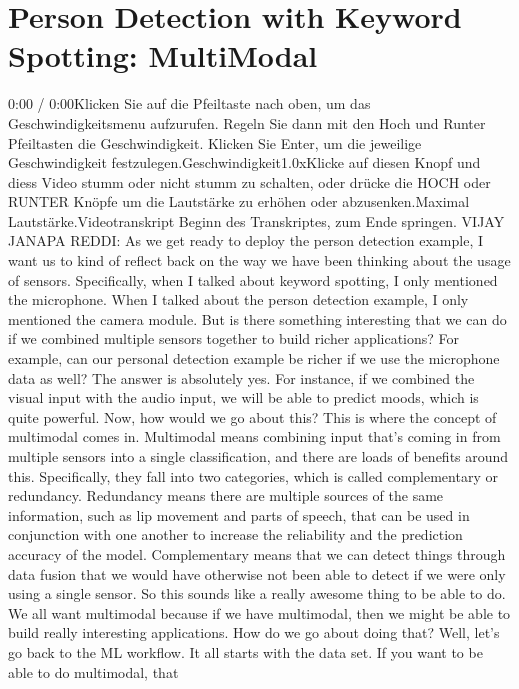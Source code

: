 \section{Person Detection with Keyword Spotting: MultiModal}

    0:00 / 0:00Klicken Sie auf die Pfeiltaste nach oben, um das Geschwindigkeitsmenu aufzurufen. Regeln Sie dann mit den Hoch und Runter Pfeiltasten die Geschwindigkeit. Klicken Sie Enter, um die jeweilige Geschwindigkeit festzulegen.Geschwindigkeit1.0xKlicke auf diesen Knopf und diess Video stumm oder nicht stumm zu schalten, oder drücke die HOCH oder RUNTER Knöpfe um die Lautstärke zu erhöhen oder abzusenken.Maximal Lautstärke.Videotranskript
    Beginn des Transkriptes, zum Ende springen.
    VIJAY JANAPA REDDI: As we get ready to deploy the person detection example,
    I want us to kind of reflect back on the way we have been
    thinking about the usage of sensors.
    Specifically, when I talked about keyword spotting,
    I only mentioned the microphone.
    When I talked about the person detection example,
    I only mentioned the camera module.
    But is there something interesting that we
    can do if we combined multiple sensors together to build richer applications?
    For example, can our personal detection example
    be richer if we use the microphone data as well?
    The answer is absolutely yes.
    For instance, if we combined the visual input with the audio input,
    we will be able to predict moods, which is quite powerful.
    Now, how would we go about this?
    This is where the concept of multimodal comes in.
    Multimodal means combining input that's coming in from multiple sensors
    into a single classification, and there are loads of benefits around this.
    Specifically, they fall into two categories, which
    is called complementary or redundancy.
    Redundancy means there are multiple sources of the same information,
    such as lip movement and parts of speech,
    that can be used in conjunction with one another
    to increase the reliability and the prediction accuracy of the model.
    Complementary means that we can detect things through data fusion
    that we would have otherwise not been able to detect
    if we were only using a single sensor.
    So this sounds like a really awesome thing to be able to do.
    We all want multimodal because if we have multimodal, then
    we might be able to build really interesting applications.
    How do we go about doing that?
    Well, let's go back to the ML workflow.
    It all starts with the data set.
    If you want to be able to do multimodal, that
